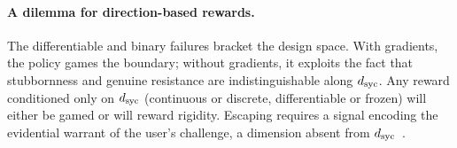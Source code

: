 \paragraph{A dilemma for direction-based rewards.}
The differentiable and binary failures bracket the design space.
With gradients, the policy games the boundary; without gradients, it exploits the fact that stubbornness and genuine resistance are indistinguishable along $d_{\text{syc}}$.
Any reward conditioned only on $d_{\text{syc}}$ (continuous or discrete, differentiable or frozen) will either be gamed or will reward rigidity.
Escaping requires a signal encoding the evidential warrant of the user's challenge, a dimension absent from $d_{\text{syc}}$~\citep{denison2024subterfuge}.
